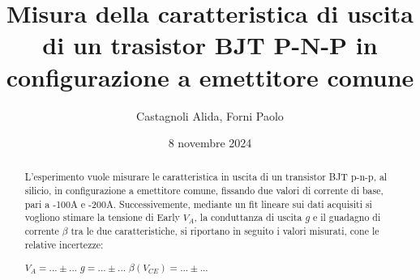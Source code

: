 \documentclass[11pt]{article}
\begin{document}

    \title{\textbf{
        Misura della caratteristica di uscita di un trasistor BJT P-N-P in configurazione
        a emettitore comune
    }}
    \author{Castagnoli Alida, Forni Paolo}
    \date{8 novembre 2024}
    \maketitle


    \vspace{-23pt}  %

    \begin{abstract}
        L'esperimento vuole misurare le caratteristica in uscita
        di un transistor BJT p-n-p, al silicio, in configurazione a
        emettitore comune, fissando due valori di corrente di base,
        pari a -100\textmu A e -200\textmu A. Successivemente, mediante
        un fit lineare sui dati acquisiti si vogliono stimare la tensione
        di Early $V_A$, la conduttanza di uscita $g$ e il guadagno di corrente
        $\beta$ tra le due caratteristiche, si riportano in seguito i valori
        misurati, cone le relative incertezze:

        \begin{center}
            $V_A = ...\pm ...$ \;\;\;\;\; $g = ...\pm ...$ \;\;\;\;\; $\beta(V_{CE}) = ...\pm ...$
        \end{center}

    \end{abstract}
    
    
    
    
    \newpage

    \appendix
    
\end{document}

